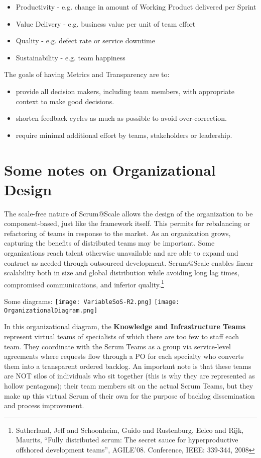 \documentclass[12pt,a4paper,parskip=full]{scrartcl}
\begin{document}
\begin{itemize}
	\item Productivity - e.g. change in amount of Working Product delivered per Sprint
	\item Value Delivery - e.g. business value per unit of team effort
	\item Quality - e.g. defect rate or service downtime
	\item Sustainability - e.g. team happiness
\end{itemize}

The goals of having Metrics and Transparency are to:

\begin{itemize}
	\item provide all decision makers, including team members, with appropriate context to make good decisions.
	\item shorten feedback cycles as much as possible to avoid over-correction.
	\item require minimal additional effort by teams, stakeholders or leadership.
\end{itemize}

\section{Some notes on Organizational Design}

The scale-free nature of Scrum@Scale allows the design of the organization to be component-based, just like the framework itself. This permits for rebalancing or refactoring of teams in response to the market. As an organization grows, capturing the benefits of distributed teams may be important. Some organizations reach talent otherwise unavailable and are able to expand and contract as needed through outsourced development. Scrum@Scale enables linear scalability both in size and global distribution while avoiding long lag times, compromised communications, and inferior quality.\footnote{Sutherland, Jeff and Schoonheim, Guido and Rustenburg, Eelco and Rijk, Maurits, ``Fully distributed scrum: The secret sauce for hyperproductive offshored development teams'', AGILE'08. Conference, IEEE: 339-344, 2008}

Some diagrams:
\texttt{[image: VariableSoS-R2.png]}
\texttt{[image: OrganizationalDiagram.png]}

In this organizational diagram, the \textbf{Knowledge and Infrastructure Teams} represent virtual teams of specialists of which there are too few to staff each team. They coordinate with the Scrum Teams as a group via service-level agreements where requests flow through a PO for each specialty who converts them into a transparent ordered backlog. An important note is that these teams are NOT silos of individuals who sit together (this is why they are represented as hollow pentagons); their team members sit on the actual Scrum Teams, but they make up this virtual Scrum of their own for the purpose of backlog dissemination and process improvement.
\end{document}
